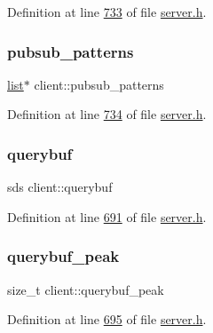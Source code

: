 Definition at line \hyperlink{server_8h_source_l00733}{733} of file \hyperlink{server_8h_source}{server.\+h}.

\mbox{\label{structclient_a811d6395007358fcf349a4d57bda2715}} 
\subsubsection{\texorpdfstring{pubsub\+\_\+patterns}{pubsub\_patterns}}
{\footnotesize\ttfamily \hyperlink{structlist}{list}$\ast$ client\+::pubsub\+\_\+patterns}



Definition at line \hyperlink{server_8h_source_l00734}{734} of file \hyperlink{server_8h_source}{server.\+h}.

\mbox{\label{structclient_aa95ee1cb708c4fec418c5ad1c838ef64}} 
\subsubsection{\texorpdfstring{querybuf}{querybuf}}
{\footnotesize\ttfamily sds client\+::querybuf}



Definition at line \hyperlink{server_8h_source_l00691}{691} of file \hyperlink{server_8h_source}{server.\+h}.

\mbox{\label{structclient_a67800016f1bcbd590adc99028990fdf5}} 
\subsubsection{\texorpdfstring{querybuf\+\_\+peak}{querybuf\_peak}}
{\footnotesize\ttfamily size\+\_\+t client\+::querybuf\+\_\+peak}



Definition at line \hyperlink{server_8h_source_l00695}{695} of file \hyperlink{server_8h_source}{server.\+h}.

\mbox{\label{structclient_adf8f7b46605cf081b77bc45b7174670a}} 
